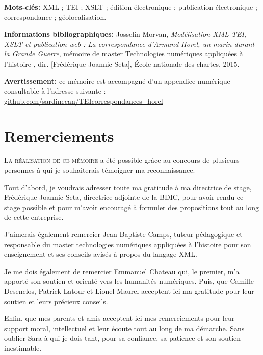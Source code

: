 \documentclass[12pt,a4paper]{book} %
\begin{document}
\bigskip

\textbf{Mots-clés:} XML ; TEI ; XSLT ; édition électronique ; publication électronique ; correspondance ; géolocalisation.

\textbf{Informations bibliographiques:} Josselin Morvan, \textit{Modélisation XML-TEI, XSLT et publication web : La correspondance d'Armand Horel, un marin durant la Grande Guerre}, mémoire de master \og Technologies numériques appliquées à l'histoire \fg{}, dir. [Frédérique Joannic-Seta], École nationale des chartes, 2015.

\textbf{Avertissement:} ce mémoire est accompagné d'un appendice numérique consultable à l'adresse suivante : \url{github.com/sardinecan/TEIcorrespondances_horel}



\clearpage
\thispagestyle{empty}
\cleardoublepage



\section*{Remerciements}

\lettrine{L}{a réalisation de ce mémoire} a été possible grâce au concours de plusieurs personnes à qui je souhaiterais témoigner ma reconnaissance.
\bigskip

Tout d'abord, je voudrais adresser toute ma gratitude à ma directrice de stage, Frédérique Joannic-Seta, directrice adjointe de la BDIC, pour avoir rendu ce stage possible et pour m'avoir encouragé à formuler des propositions tout au long de cette entreprise. %

J'aimerais également remercier Jean-Baptiste Camps, tuteur pédagogique et responsable du master \og technologies numériques appliquées à l'histoire \fg{} pour son enseignement et ses conseils avisés à propos du langage XML.

Je me dois également de remercier Emmanuel Chateau qui, le premier, m'a apporté son soutien et orienté vers les humanités numériques. Puis, que Camille Desenclos, Patrick Latour et Lionel Maurel acceptent ici ma gratitude pour leur soutien et leurs précieux conseils.

Enfin, que mes parents et amis acceptent ici mes remerciements pour leur support moral, intellectuel et leur écoute tout au long de ma démarche. Sans oublier Sara à qui je dois tant, pour sa confiance, sa patience et son soutien inestimable.
\end{document}

